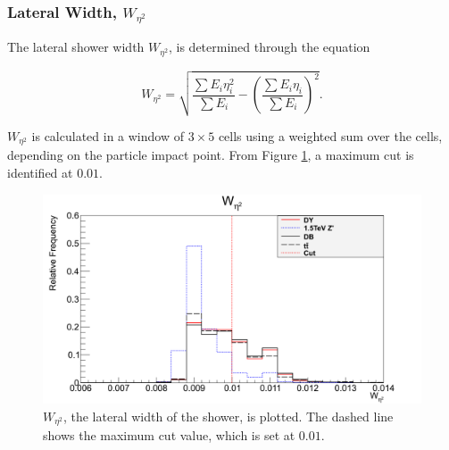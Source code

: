\documentclass{article}
\begin{document}
\subsubsection{Lateral Width, $W_{\eta^2}$}

The lateral shower width $W_{\eta^2}$, is determined through the equation 

\begin{equation}
W_{\eta^2} = \sqrt{\frac{\sum E_i \eta_{i}^{2}}{\sum E_i} - \left( \frac{\sum E_i \eta_i}{\sum E_i} \right)^2 }.
\end{equation}

$W_{\eta^2}$ is calculated in a window of $3\times5$ cells using a weighted sum over the cells, depending on the particle impact point.
From Figure \ref{fig:wEta}, a maximum cut is identified at $0.01$.

\begin{figure}[h]
    \centering
    \includegraphics[scale=0.25]{images/variables/wEta.png}
    \caption{$W_{\eta^2}$, the lateral width of the shower, is plotted. The dashed line shows the maximum cut value, which is set at $0.01$\label{fig:wEta}. }
\end{figure}

\end{document}
